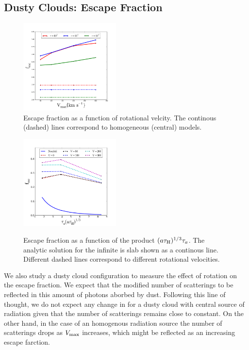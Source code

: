 \documentclass[usenatbib]{mn2e}
\begin{document}
\subsection{Dusty Clouds: Escape Fraction}
\label{sec:escapefraction}


\begin{figure}
  \includegraphics[width=0.45\textwidth]{escapefraction.png}
   \caption{Escape fraction as a function of rotational velcity. The
     continous (dashed) lines correspond to homogeneous (central)
     models.
     \label{fig:efvsv}}
\end{figure}


\begin{figure}
  \includegraphics[width=0.45\textwidth]{Neufeld.png}
 \label{fig:efvsNeufeld}\caption{Escape fraction as a function of the
   product $(a\tau_{\rm H})^{1/3}\tau_{a}$. The analytic solution for
   the infinite is slab shown as a continous line. Different dashed
   lines correspond to different rotational velocities.}   
\end{figure}

We also study a dusty cloud configuration to measure the effect of
rotation on the escape fraction. We expect that the modified number of
scatterings to be reflected in this amount of photons aborbed by
dust. Following this line of thought,  we do not expect any change in
for a dusty cloud with central source of radiation given that the
number of scatterings remains close to constant. On the other hand, in
the case of an homogenous radiation source the number of scatterings
drops as $V_{\rm max}$ increases, which might be reflected as an
increasing escape farction.
\end{document}
